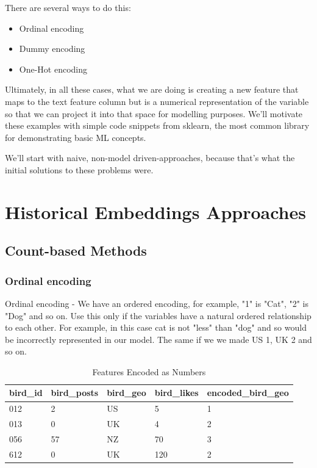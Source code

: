 \documentclass[draft, 11pt]{diazessay} %
\begin{document}
There are several ways to do this:

\begin{itemize}
  \item Ordinal encoding   
  \item Dummy encoding 
  \item One-Hot encoding
\end{itemize}

Ultimately, in all these cases, what we are doing is creating a new feature that maps to the text feature column but is a numerical representation of the variable so that we can project it into that space for modelling purposes. We'll motivate these examples with simple code snippets from sklearn, the most common library for demonstrating basic ML concepts. 

We'll start with naive, non-model driven-approaches, because that's what the initial solutions to these problems were. 

\section{Historical Embeddings Approaches}
\subsection{Count-based Methods}

\subsubsection{Ordinal encoding}
Ordinal encoding - We have an ordered encoding, for example, "1" is "Cat", "2" is "Dog" and so on. Use this only if the variables have a natural ordered relationship to each other. For example, in this case cat is not "less" than "dog" and so would be incorrectly represented in our model. The same if we we made US 1, UK 2 and so on. 

\begin{table}[H]
 \centering
    \caption{Features Encoded as Numbers}
\begin{tabular}{|l|l|l|l|l|}
\hline
\rowcolor[HTML]{EFEFEF} 
bird\_id & bird\_posts & bird\_geo & bird\_likes & encoded\_bird\_geo \\ \hline
012      & 2           & US        & 5           & 1                  \\ \hline
013      & 0           & UK        & 4           & 2                  \\ \hline
056      & 57          & NZ        & 70          & 3                  \\ \hline
612      & 0           & UK        & 120         & 2                  \\ \hline
\end{tabular}
\end{table}
\end{document}
